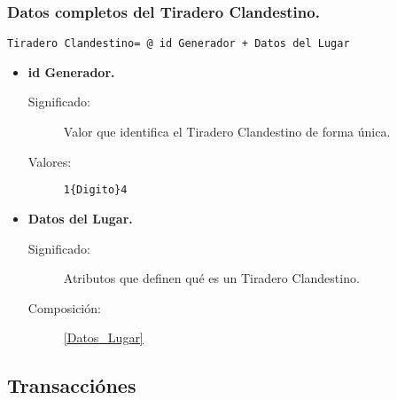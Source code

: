 \subsubsection{Datos completos del Tiradero Clandestino.}
\begin{lstlisting}
Tiradero Clandestino= @ id Generador + Datos del Lugar
\end{lstlisting}
	\begin{itemize}
		\item \textbf{id Generador.}
			\begin{description}
				\item [Significado:] Valor que identifica el Tiradero Clandestino de forma única.
				\item [Valores:]{\begin{lstlisting}
1{Digito}4\end{lstlisting}}
			\end{description}
		\item \textbf{Datos del Lugar.}
			\begin{description}
				\item [Significado:] Atributos que definen qué es un Tiradero Clandestino.
				\item [Composición:] \ref{Datos_Lugar}
			\end{description}
	\end{itemize}

\subsection{Transacciónes}\label{Datos_Transferencia}\label{Datos_Entrega}
